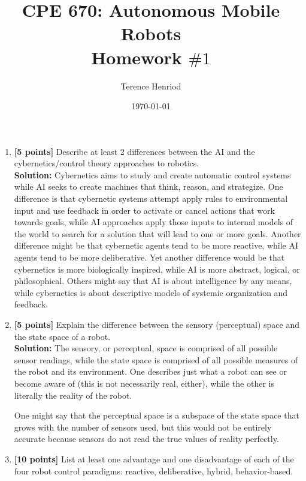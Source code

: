 \documentclass{article}
\title{CPE 670: Autonomous Mobile Robots \\ Homework $\#1$}
\author{Terence Henriod}
\date{\today}
\begin{document}
\maketitle

\newpage
\begin{enumerate}
\item \textbf{[5 points]} Describe at least 2 differences between the AI and the cybernetics/control theory approaches to robotics. \\

\textbf{Solution:} Cybernetics aims to study and create automatic control systems while AI seeks to create machines that think, reason, and strategize. One difference is that cybernetic systems attempt apply rules to environmental input and use feedback in order to activate or cancel actions that work towards goals, while AI approaches apply those inputs to internal models of the world to search for a solution that will lead to one or more goals. Another difference might be that cybernetic agents tend to be more reactive, while AI agents tend to be more deliberative. Yet another difference would be that cybernetics is more biologically inspired, while AI is more abstract, logical, or philosophical. Others might say that AI is about intelligence by any means, while cybernetics is about descriptive models of systemic organization and feedback. \newline \\


\item \textbf{[5 points]} Explain the difference between the sensory (perceptual) space and the state space of a robot. \\

\textbf{Solution:} The sensory, or perceptual, space is comprised of all possible sensor readings, while the state space is comprised of all possible measures of the robot and its environment. One describes just what a robot can see or become aware of (this is not necessarily real, either), while the other is literally the reality of the robot.

One might say that the perceptual space is a subspace of the state space that grows with the number of sensors used, but this would not be entirely accurate because sensors do not read the true values of reality perfectly. \newline \\


\item \textbf{[10 points]} List at least one advantage and one disadvantage of each of the four robot control paradigms: reactive, deliberative, hybrid, behavior-based. \\


\end{enumerate}
\end{document}
